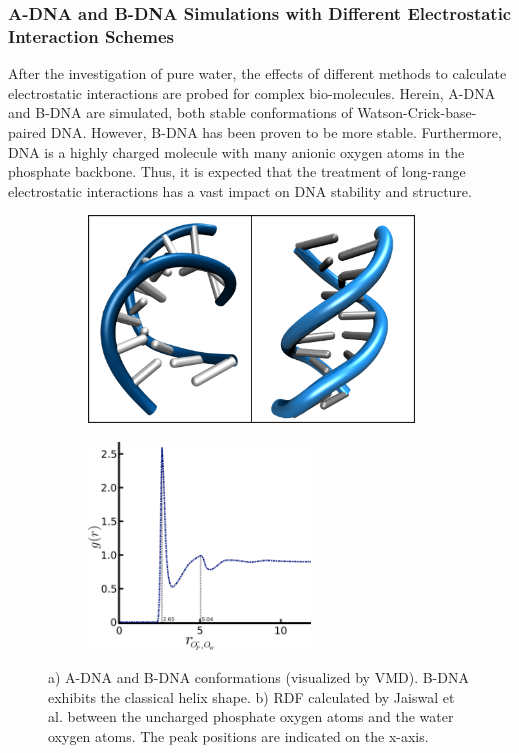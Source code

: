 \documentclass[9pt,tutorial]{livecoms}
\begin{document}
\subsubsection*{A-DNA and B-DNA Simulations with Different Electrostatic Interaction Schemes}
After the investigation of pure water, the effects of different methods to calculate electrostatic interactions are probed for complex bio-molecules. Herein, A-DNA and B-DNA are simulated, both stable conformations of Watson-Crick-base-paired DNA. However, B-DNA has been proven to be more stable. Furthermore, DNA is a highly charged molecule with many anionic oxygen atoms in the phosphate backbone. Thus, it is expected that the treatment of long-range electrostatic interactions has a vast impact on DNA stability and structure.\\
\begin{figure}[H]
    \begin{subfigure}[c]{0.5\textwidth}
        \centering
        \includegraphics[height=55mm]{figures/a_b_dna.png}
        \caption{}
        \label{fig:abdna}
    \end{subfigure}
    \begin{subfigure}[c]{0.5\textwidth}
        \centering
        \includegraphics[height=55mm]{figures/Ref_DNA_RDF.png}
        \caption{}
        \label{fig:dnardf}
    \end{subfigure}
    \caption[DNA Conformations and Published RDF]{a) A-DNA and B-DNA conformations (visualized by VMD). B-DNA exhibits the classical helix shape. b) RDF calculated by Jaiswal et al.\cite{Jaiswal2018} between the uncharged phosphate oxygen atoms and the water oxygen atoms. The peak positions are indicated on the x-axis.}
\end{figure}
\end{document}

